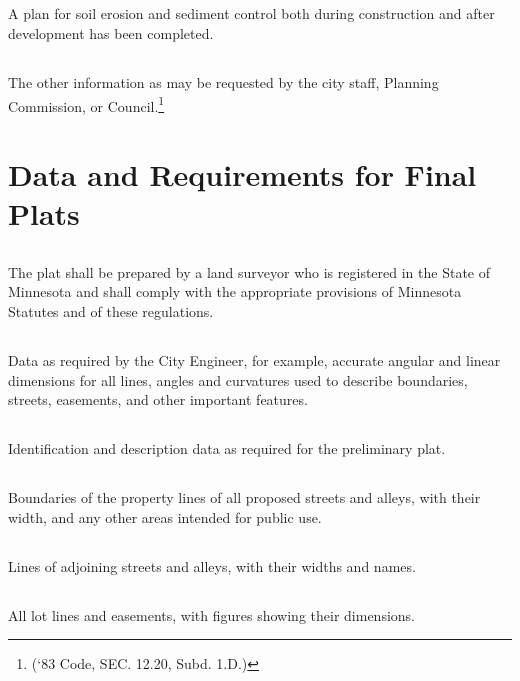 \subsection{}
A plan for soil erosion and sediment control both during construction and after development has been completed.
\subsection{}
The other information as may be requested by the city staff, Planning Commission, or Council.\footnote{(‘83 Code, SEC. 12.20, Subd. 1.D.)}

\section{Data and Requirements for Final Plats}
\subsection{}
The plat shall be prepared by a land surveyor who is registered in the State of Minnesota and shall comply with the appropriate provisions of Minnesota Statutes and of these regulations.
\subsection{}
Data as required by the City Engineer, for example, accurate angular and linear dimensions for all lines, angles and curvatures used to describe boundaries, streets, easements, and other important features.
\subsection{}
Identification and description data as required for the preliminary plat.
\subsection{}
Boundaries of the property lines of all proposed streets and alleys, with their width, and any other areas intended for public use.
\subsection{}
Lines of adjoining streets and alleys, with their widths and names.
\subsection{}
All lot lines and easements, with figures showing their dimensions.
